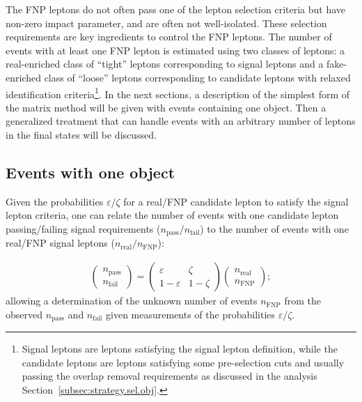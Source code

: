 The FNP leptons do not often pass one of the 
lepton selection criteria but have non-zero impact parameter, and are often not 
well-isolated. These selection requirements are key ingredients to control the FNP leptons. 
The number of events with at least one FNP lepton is estimated using two classes of leptons: 
a real-enriched class of ``tight'' leptons corresponding to signal leptons and a fake-enriched class of ``loose'' leptons 
corresponding to candidate leptons with relaxed identification criteria\footnote{Signal leptons are leptons satisfying the signal lepton definition, while the candidate leptons are leptons satisfying some pre-selection cuts and usually passing the overlap removal requirements as discussed in the analysis 
Section~\ref{subsec:strategy.sel.obj}.}. 
In the next sections, a description of the simplest form of the matrix method will be given with events containing one object. 
Then a generalized treatment that can handle events with an arbitrary number of leptons in the final states will be discussed.

\subsection{Events with one object}

Given the probabilities $\varepsilon/\zeta$ for a real/FNP candidate lepton to satisfy the signal lepton criteria, 
one can relate the number of events with one candidate lepton passing/failing signal requirements ($n_\text{pass}/n_\text{fail}$) to the number of events with one real/FNP signal leptons ($n_\text{real}/n_\text{FNP}$):

\begin{align}
\begin{pmatrix}n_\text{pass}\\n_\text{fail}\end{pmatrix} 
= \begin{pmatrix}\varepsilon & \zeta\\ 1-\varepsilon & 1-\zeta\end{pmatrix}
\begin{pmatrix}n_\text{real}\\n_\text{FNP}\end{pmatrix}; 
\label{eqn:matrix_method}
\end{align}
allowing a determination of the unknown number of events $n_\text{FNP}$ from the observed $n_\text{pass}$ and $n_\text{fail}$ given measurements of the 
probabilities $\varepsilon/\zeta$. 

